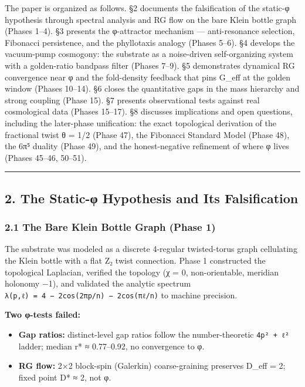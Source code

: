 \documentclass[
]{article}
\providecommand{\tightlist}{%
  \setlength{\itemsep}{0pt}\setlength{\parskip}{0pt}}
\begin{document}
The paper is organized as follows. §2 documents the falsification of the
static-φ hypothesis through spectral analysis and RG flow on the bare
Klein bottle graph (Phases 1--4). §3 presents the φ-attractor mechanism
--- anti-resonance selection, Fibonacci persistence, and the phyllotaxis
analogy (Phases 5--6). §4 develops the vacuum-pump cosmogony: the
substrate as a noise-driven self-organizing system with a golden-ratio
bandpass filter (Phases 7--9). §5 demonstrates dynamical RG convergence
near φ and the fold-density feedback that pins G\_eff at the golden
window (Phases 10--14). §6 closes the quantitative gaps in the mass
hierarchy and strong coupling (Phase 15). §7 presents observational
tests against real cosmological data (Phases 15--17). §8 discusses
implications and open questions, including the later-phase unification:
the exact topological derivation of the fractional twist θ = 1/2 (Phase
47), the Fibonacci Standard Model (Phase 48), the 6π⁵ duality (Phase
49), and the honest-negative refinement of where φ lives (Phases 45--46,
50--51).

\begin{center}\rule{0.5\linewidth}{0.5pt}\end{center}

\subsection{2. The Static-φ Hypothesis and Its
Falsification}\label{the-static-ux3c6-hypothesis-and-its-falsification}

\subsubsection{2.1 The Bare Klein Bottle Graph (Phase
1)}\label{the-bare-klein-bottle-graph-phase-1}

The substrate was modeled as a discrete 4-regular twisted-torus graph
cellulating the Klein bottle with a flat Z₂ twist connection. Phase 1
constructed the topological Laplacian, verified the topology (χ = 0,
non-orientable, meridian holonomy −1), and validated the analytic
spectrum \texttt{λ(p,ℓ)\ =\ 4\ −\ 2cos(2πp/n)\ −\ 2cos(πℓ/n)} to machine
precision.

\textbf{Two φ-tests failed:}

\begin{itemize}
\tightlist
\item
  \textbf{Gap ratios:} distinct-level gap ratios follow the
  number-theoretic \texttt{4p²\ +\ ℓ²} ladder; median r* ≈ 0.77--0.92,
  no convergence to φ.
\item
  \textbf{RG flow:} 2×2 block-spin (Galerkin) coarse-graining preserves
  D\_eff = 2; fixed point D* ≈ 2, not φ.
\end{itemize}
\end{document}
